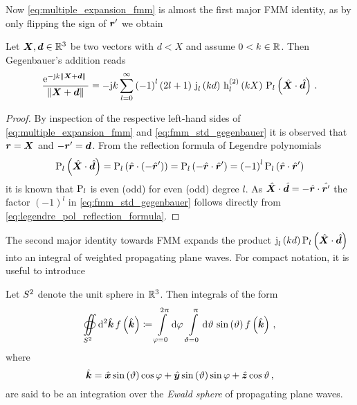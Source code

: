 Now \eqref{eq:multiple_expansion_fmm} is almost the first major \ac{FMM}
identity, as by only flipping the sign of $\rsrc$ we obtain
\begin{lemma}
	Let $\pvec{X}, \pvec{d} \in \R^3$ be two vectors with
	$d < X$ and assume $0 < k \in \mathbb{R}$.
	Then Gegenbauer's addition reads
	\begin{equation}\label{eq:fmm_std_gegenbauer}
		\frac{\exp{-\im k \norm{\pvec{X} + \pvec{d}}}}{\norm{\pvec{X} + \pvec{d}}} = 
		-\im k \sum\limits_{l=0}^{\infty}
		\left( -1 \right)^l
		\left( 2l + 1 \right) \,
		\sphbesselj{l} \left( k d  \right) \,
		\sphbesselh{2}{l} \left( k X \right) \, 
		\legendrepl{l} \left( \uv{X} \cdot  \uv{d} \right)
		\, .
	\end{equation}
\end{lemma} 
\begin{proof}
	By inspection of the respective left-hand sides of
	\eqref{eq:multiple_expansion_fmm} and
	\eqref{eq:fmm_std_gegenbauer} it is observed that $\robs = \pvec{X}$
	and $-\rsrc = \pvec{d}$.
	From the reflection formula of Legendre polynomials
	\cite[(14.7.17)]{Olver2010}
	\begin{equation}\label{eq:legendre_pol_reflection_formula}
		\legendrepl{l} \left( \uv{X} \cdot \uv{d} \right) =
		\legendrepl{l} \left( \uv{r} \cdot \left(-\uv{r}^\prime\right) \right) =
		\legendrepl{l} \left( -\uv{r} \cdot \uv{r}^\prime \right) =
		\left(-1\right)^l \legendrepl{l} \left( \uv{r} \cdot \uv{r}^\prime \right)
	\end{equation}
	it is known that $\operatorname{P}_{l}$ is even (odd) for even (odd) degree $l$.
	As $\uv{X} \cdot \uv{d} = -\uv{r} \cdot \uv{r^\prime} $
	the factor $\left(-1\right)^l$ in \eqref{eq:fmm_std_gegenbauer} follows
	directly from \eqref{eq:legendre_pol_reflection_formula}.
\end{proof}

The second major identity towards \ac{FMM} expands the product 
$\sphbesselj{l} \left( k d \right) \legendrepl{l} \left( \uv{X} \cdot \uv{d} \right)$
into an integral of weighted propagating plane waves. For compact notation, it
is useful to introduce
\begin{definition}\label{def:ewald_sphere}
	Let $S^2$ denote the unit sphere in $\mathbb{R}^3$. Then
	integrals of the form
	\begin{equation}\label{eq:ewald_sphere_integral}
		\ewaldintegral f \left(\uv{k}\right) 
		\coloneqq
		\int\limits_{\varphi = 0}^{2\pi} \dd \varphi \, 
		\int\limits_{\vartheta = 0}^{\pi} \dd \vartheta  \, 
		\sin\left(\vartheta \right)
		f \left(\uv{k}\right)
		\, ,
	\end{equation}
	where
	\begin{equation}
		\uv{k} =
		\uv{x} \sin \left(\vartheta\right) \cos \varphi +
		\uv{y} \sin \left(\vartheta\right) \sin \varphi +
		\uv{z} \cos \vartheta \, ,
	\end{equation}
	are said to be an integration over the \emph{Ewald sphere} of propagating
	plane waves.
\end{definition}

